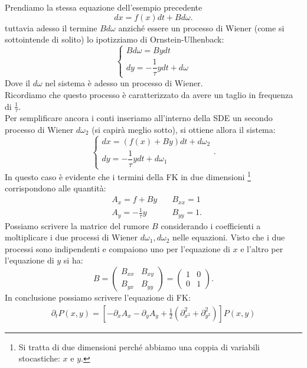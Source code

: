 \begin{exmp}[Processo di OU]
    Prendiamo la stessa equazione dell'esempio precedente
    \[
	dx = f(x) dt + Bd\omega
    .\] 
    tuttavia adesso il termine $Bd\omega$ anziché essere un processo di Wiener (come si sottointende di solito) lo ipotizziamo di Ornstein-Ulhenback:
    \[
	\begin{cases}
	    Bd\omega  = Bydt\\
	    dy = -\dfrac{1}{\tau}ydt + d\omega
	\end{cases}
    \] 
    Dove il $d\omega$ nel sistema è adesso un processo di Wiener.\\
    Ricordiamo che questo processo è caratterizzato da avere un taglio in frequenza di $\frac{1}{\tau}$.\\
    Per semplificare ancora i conti inseriamo all'interno della SDE un secondo processo di Wiener $d\omega_2$ (si capirà meglio sotto), si ottiene allora il sistema:
    \[
        \begin{cases}
	    dx = \left(f(x) + By\right)dt + d\omega_2\\
	    dy = -\dfrac{1}{\tau}y dt + d\omega_1
        \end{cases}
    .\] 
    In questo caso è evidente che i termini della FK in due dimensioni
    \footnote{Si tratta di due dimensioni perché abbiamo una coppia di variabili stocastiche: $x$ e $y$.}
     corrispondono alle quantità:
    \[\begin{aligned}
	&A_x = f+By & \quad B_{xx} = 1\\
	&A_y = -\frac{1}{\tau}y &\quad B_{yy}=1
    .\end{aligned}\]
    Possiamo scrivere la matrice del rumore $B$ considerando i coefficienti a moltiplicare i due processi di Wiener $d\omega_1, d\omega_2$ nelle equazioni. Visto che i due processi sono indipendenti e compaiono uno per l'equazione di $x$ e l'altro per l'equazione di $y$ si ha:
    \[
        B = 
	\begin{pmatrix}
	    B_{xx} & B_{xy}\\
	    B_{yx} & B_{yy}
	\end{pmatrix}
	=
	\begin{pmatrix}
	    1 & 0\\
	    0 & 1
        \end{pmatrix}
    .\] 
    In conclusione possiamo scrivere l'equazione di FK:
    \[\begin{aligned}
	\partial_{t}P(x,y) = \left[-\partial_{x}A_x - \partial_{y}A_y + \frac{1}{2}(\partial^2_{x^2}+\partial^2_{y^2}) \right]P(x,y) 

\end{aligned}\]
\end{exmp}
